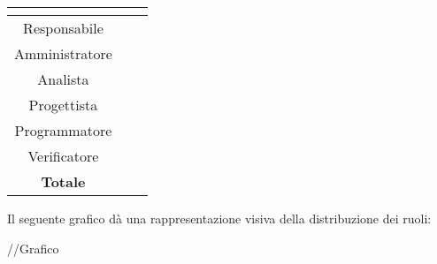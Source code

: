 \begin{center}
\renewcommand{\arraystretch}{1.5}
\begin{tabular}{|c|c|c|}
\hline
\rowcolor{title_row}
\textbf{\color{title_text}{Ruolo}}  & \textbf{\color{title_text}{Ore}} & \textbf{\color{title_text}{Costo in \euro}} \\ \hline
Responsabile    &              &                     \\ \hline
Amministratore  &              &                     \\ \hline
Analista        &              &                     \\ \hline
Progettista     &              &                     \\ \hline
Programmatore   &              &                     \\ \hline
Verificatore    &              &                     \\ \hline
\textbf{Totale} & \textbf{}    & \textbf{}           \\ \hline
\end{tabular}
\renewcommand{\arraystretch}{1}
\end{center}

Il seguente grafico dà una rappresentazione visiva della distribuzione dei ruoli: \\
\begin{center}
//Grafico
\end{center}

\pagebreak